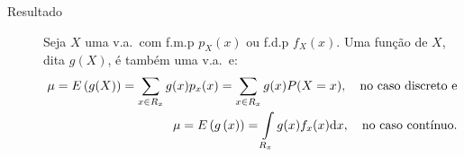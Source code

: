 \begin{description}
         \item [Resultado] Seja $X$ uma v.a.\ com f.m.p $p_{X}(x)$ ou f.d.p $f_{X}(x)$. Uma função
           de $X$, dita $g(X)$, é também uma v.a.\ e: 
           \begin{align}
             \mu=E\left(g(X)\right)=\sum \limits_{x \in R_{x}} g(x)p_{x}(x)
             =\sum \limits_{x \in R_{x}} g(x)P(X=x), \text{\quad no caso discreto e} \nonumber \\
          \mu=   E\left(g \left(x \right)\right)=\int \limits_{R_{x}} g(x)f_{x}(x)\mathrm{d}x, \text{\quad no caso contínuo.}
           \end{align}

       \end{description}

